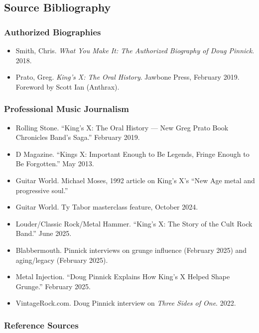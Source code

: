 \documentclass[11pt,letterpaper]{article}
\begin{document}
\subsection{Source Bibliography}

\subsubsection{Authorized Biographies}

\begin{itemize}[leftmargin=2em]
\item Smith, Chris. \textit{What You Make It: The Authorized Biography of Doug Pinnick}. 2018.
\item Prato, Greg. \textit{King's X: The Oral History}. Jawbone Press, February 2019. Foreword by Scott Ian (Anthrax).
\end{itemize}

\subsubsection{Professional Music Journalism}

\begin{itemize}[leftmargin=2em]
\item Rolling Stone. ``King's X: The Oral History --- New Greg Prato Book Chronicles Band's Saga.'' February 2019.
\item D Magazine. ``Kings X: Important Enough to Be Legends, Fringe Enough to Be Forgotten.'' May 2013.
\item Guitar World. Michael Moses, 1992 article on King's X's ``New Age metal and progressive soul.''
\item Guitar World. Ty Tabor masterclass feature, October 2024.
\item Louder/Classic Rock/Metal Hammer. ``King's X: The Story of the Cult Rock Band.'' June 2025.
\item Blabbermouth. Pinnick interviews on grunge influence (February 2025) and aging/legacy (February 2025).
\item Metal Injection. ``Doug Pinnick Explains How King's X Helped Shape Grunge.'' February 2025.
\item VintageRock.com. Doug Pinnick interview on \textit{Three Sides of One}. 2022.
\end{itemize}

\subsubsection{Reference Sources}
\end{document}
